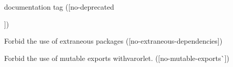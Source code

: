 
\begin{DoxyRefList}
\item[\label{deprecated__deprecated000001}%
\Hypertarget{deprecated__deprecated000001}%
页 \mbox{\hyperlink{md__c_1_workspace_demo_src_main_script_node_modules_eslint-plugin-import__r_e_a_d_m_e}{eslint-\/plugin-\/import}} ]{\ttfamily documentation tag (\mbox{[}}no-\/deprecated{\ttfamily \mbox{]})
\begin{DoxyItemize}
\item Forbid the use of extraneous packages (\mbox{[}no-\/extraneous-\/dependencies{\ttfamily \mbox{]})}
\item {\ttfamily Forbid the use of mutable exports with}var{\ttfamily or}let{\ttfamily . (\mbox{[}}no-\/mutable-\/exports\`{}\mbox{]})
\end{DoxyItemize}}
\end{DoxyRefList}